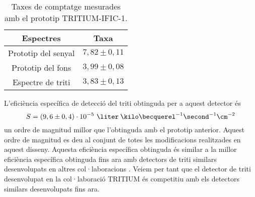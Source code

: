 \begin{table}[htbp]
\centering{}%
\begin{tabular}{cc}
\toprule 
Espectres & Taxa  \tabularnewline
\midrule
\midrule 
Prototip del senyal & $7,82 \pm 0,11$ \tabularnewline
Prototip del fons & $3,99 \pm 0,08$ \tabularnewline  
Espectre de triti & $3,83 \pm 0,13$ \tabularnewline
\bottomrule
\end{tabular}
\caption{Taxes de comptatge mesurades amb el prototip TRITIUM-IFIC-1.}
\label{tab:ContesPerSegonTRITIUMIFIC1}
\end{table}

L'eficiència específica de detecció del triti obtinguda per a aquest detector és
$$S = (9,6 \pm 0,4)\cdot{} 10^{-5}~\liter\:\kilo\becquerel^{-1}\second^{-1}\cm^{-2}$$
un ordre de magnitud millor que l'obtinguda amb el prototip anterior. Aquest ordre de magnitud es deu al conjunt de totes les modificacions realitzades en aquest disseny. Aquesta eficiència específica obtinguda és similar a la millor eficiència específica obtinguda fins ara amb detectors de triti similars desenvolupats en altres col·laboracions \cite{Hofstetter1, Hofstetter2}. Veiem per tant que el detector de triti desenvolupat en la col·laboració TRITIUM és competitiu amb els detectors similars desenvolupats fins ara.